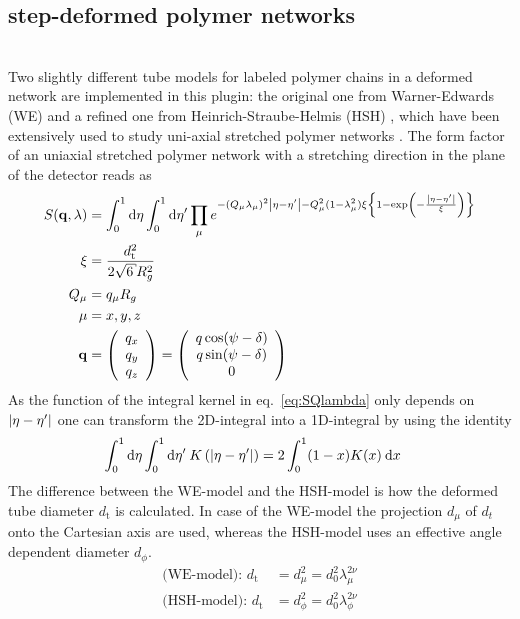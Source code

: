 \newpage
\subsection{step-deformed polymer networks}
\label{sect:DeformedPolymerNetwork}
\hspace{1pt}\\
Two slightly different tube models for labeled polymer chains in a deformed network are implemented in this plugin: the original one from Warner-Edwards (WE) \cite{Warner1978} and a refined one from Heinrich-Straube-Helmis (HSH) \cite{Heinrich1988}, which have been extensively used to study uni-axial stretched polymer networks \cite{Straube1995,Mergell2001,Westermann2001,Westermann1999,Westermann1996,Read1997}.
The form factor of an uniaxial stretched polymer network with a stretching direction in the plane of the detector reads as
\begin{align}
\label{eq:SQlambda}
S(\mathbf{q},\lambda) &= \int_0^1\mathrm{d}\eta \int_0^1 \mathrm{d}\eta' \prod_{\mu} e^{-\left(Q_\mu\lambda_\mu\right)^2\abs{\eta-\eta'}-Q_\mu^2(1-\lambda_\mu^2)\xi\left\{1-\exp\left(-\frac{\abs{\eta-\eta'}}{\xi}\right)\right\}} \\
\xi &= \frac{d_\mathrm{t}^2}{2\sqrt{6}R_g^2} \\
Q_\mu &= q_\mu R_g\\
\mu  &= x,y,z \\
\mathbf{q} &= \Vek{q_x}{q_y}{q_z} = \Vek{q \cos(\psi-\delta)}{q\sin(\psi-\delta)}{0}
\end{align}
As the function of the integral kernel in eq.\ \ref{eq:SQlambda} only depends on $\abs{\eta-\eta'}$ one can transform the 2D-integral into a 1D-integral by using the identity
\begin{align}
\label{eq:2D1D_int_identity}
\int_0^1\mathrm{d}\eta \int_0^1 \mathrm{d}\eta' \: K\left(\abs{\eta-\eta'}\right) &= 2 \int_0^1 (1-x)K(x)\: \mathrm{d}x
\end{align}
The difference between the WE-model and the HSH-model is how the deformed tube diameter $d_\mathrm{t}$ is calculated. In case of the WE-model the projection $d_\mu$ of $d_t$ onto the Cartesian axis are used, whereas the HSH-model uses an effective angle dependent diameter $d_\phi$.
\begin{align}
\mbox{(WE-model): } d_\mathrm{t} &= d_\mu^2 = d_0^2\lambda_\mu^{2\nu} \\
\mbox{(HSH-model): } d_\mathrm{t} &= d_\phi^2 = d_0^2\lambda_\phi^{2\nu}
\end{align}
